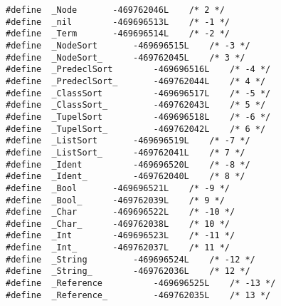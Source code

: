 \begin{verbatim}
#define  _Node 		 -469762046L	/* 2 */
#define  _nil 		 -469696513L	/* -1 */
#define  _Term 		 -469696514L	/* -2 */
#define  _NodeSort 		 -469696515L	/* -3 */
#define  _NodeSort_		 -469762045L	/* 3 */
#define  _PredeclSort 		 -469696516L	/* -4 */
#define  _PredeclSort_		 -469762044L	/* 4 */
#define  _ClassSort 		 -469696517L	/* -5 */
#define  _ClassSort_		 -469762043L	/* 5 */
#define  _TupelSort 		 -469696518L	/* -6 */
#define  _TupelSort_		 -469762042L	/* 6 */
#define  _ListSort 		 -469696519L	/* -7 */
#define  _ListSort_		 -469762041L	/* 7 */
#define  _Ident 		 -469696520L	/* -8 */
#define  _Ident_		 -469762040L	/* 8 */
#define  _Bool 		 -469696521L	/* -9 */
#define  _Bool_		 -469762039L	/* 9 */
#define  _Char 		 -469696522L	/* -10 */
#define  _Char_		 -469762038L	/* 10 */
#define  _Int 		 -469696523L	/* -11 */
#define  _Int_		 -469762037L	/* 11 */
#define  _String 		 -469696524L	/* -12 */
#define  _String_		 -469762036L	/* 12 */
#define  _Reference 		 -469696525L	/* -13 */
#define  _Reference_		 -469762035L	/* 13 */

\end{verbatim}


